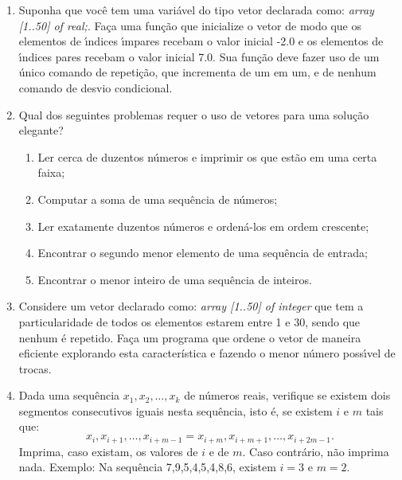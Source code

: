 \begin{enumerate}
\item Suponha que voc\^e tem uma vari\'avel do tipo vetor declarada como:
\emph{array [1..50] of real;}. 
Fa\c ca uma fun\c c\~ao 
que inicialize o vetor de modo que os elementos
de \'{\i}ndices \'{\i}mpares recebam o valor inicial -2.0 e os elementos
de \'{\i}ndices pares recebam o valor inicial 7.0. Sua função deve
fazer uso de um único comando de repetição, que incrementa de um em um, e de 
nenhum comando de desvio condicional.

\item Qual dos seguintes problemas requer o uso de vetores para uma solu\c c\~ao elegante?
\begin {enumerate}
\item Ler cerca de duzentos n\'umeros e imprimir os que est\~ao em uma certa faixa;
\item Computar a soma de uma sequ\^encia de n\'umeros;
\item Ler exatamente duzentos n\'umeros e orden\'a-los em ordem crescente;
\item Encontrar o segundo menor elemento de uma sequ\^encia de entrada;
\item Encontrar o menor inteiro de uma sequ\^encia de inteiros.
\end {enumerate}

\item Considere um vetor  declarado como: 
\emph{array [1..50] of integer} que tem a 
particularidade de todos os elementos estarem entre 1 e 30, sendo que
nenhum \'e repetido. Fa\c ca um programa
que ordene o vetor de maneira eficiente explorando esta característica e fazendo
o menor n\'umero poss\'{\i}vel de trocas.

\item   Dada uma sequência $x_1, x_2, \ldots, x_k$ de números
  reais, verifique  se existem dois segmentos  consecutivos iguais nesta
  sequência, isto é, se existem $i$ e $m$ tais que:
\[ x_i, x_{i+1}, \ldots, x_{i+m-1}=x_{i+m}, x_{i+m+1}, \ldots, x_{i+2m-1}.
\]
Imprima, caso existam,  os valores de $i$ e de  $m$. Caso contrário, não
imprima  nada. Exemplo:  Na sequência  7,9,5,4,5,4,8,6, existem  $i=3$ e
$m=2$. 


\end{enumerate}

